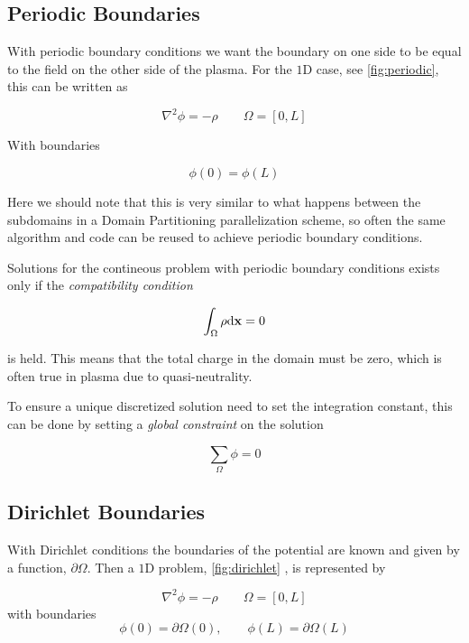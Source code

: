 \subsection{Periodic Boundaries}
	With periodic boundary conditions we want the boundary on one side to be equal
	to the field on the other side of the plasma. For the \(1\)D case, see \cref{fig:periodic},
	this can be written as

	\begin{equation}
		\nabla^2 \phi = -\rho \qquad \Omega = [0,L]
	\end{equation}

	With boundaries

	\begin{equation}
		\phi(0) = \phi(L)
	\end{equation}

	Here we should note that this is very similar to what happens between the subdomains
	in a Domain Partitioning parallelization scheme, so often the same algorithm and code
	can be reused to achieve periodic boundary conditions.

	Solutions for the contineous problem with periodic boundary conditions exists only if
	the \textit{compatibility condition} \citep{trottenberg_multigrid_2000}

	\begin{equation}
			\int_\Omega \rho\differential \vb{x} = 0
	\end{equation}

	is held. This means that the total charge in the domain must be zero, which
	is often true in plasma due to quasi-neutrality.

	To ensure a unique discretized solution need to set the integration constant, this can be done
	by setting a \textit{global constraint} on the solution

	\begin{equation}
		\sum_{\Omega} \phi = 0 \label{eq:global_constraint}
	\end{equation}

\subsection{Dirichlet Boundaries}
	With Dirichlet conditions the boundaries of the potential are known and given by a function,
	\(\partial\Omega\). Then a \(1\)D problem, \cref{fig:dirichlet} , is represented by

	\begin{equation}
		\nabla^2 \phi = -\rho \qquad \Omega = [0,L]
	\end{equation}
	with boundaries
	\begin{equation}
		\phi(0) = \partial \Omega(0), \qquad \phi(L) =  \partial\Omega(L)
	\end{equation}



